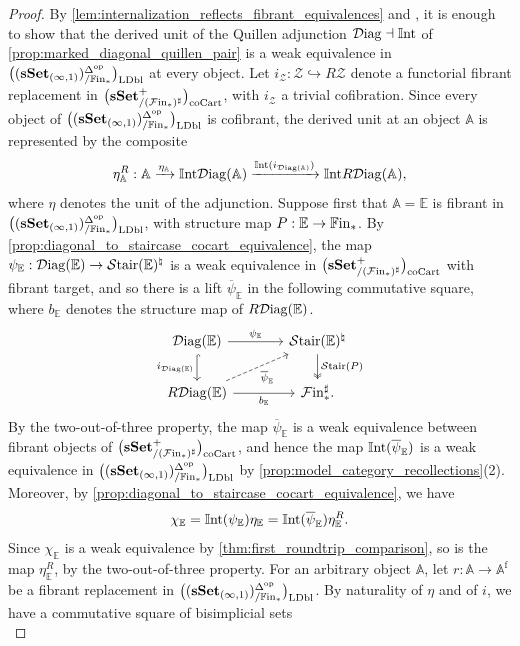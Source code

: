 \documentclass[10pt,reqno]{amsart}
\begin{document}
\begin{proof}
By \cref{lem:internalization_reflects_fibrant_equivalences} and
\cite[Corollary~1.3.16\textup{(c)}]{hovey1999model}, it is enough to
show that the derived unit of the Quillen adjunction
$\mathcal{D}\mathrm{iag}\dashv\mathbb{I}\mathrm{nt}$ of \cref{prop:marked_diagonal_quillen_pair} is a
weak equivalence in $\bigl((\mathbf{sSet}_{(\infty,1)})^{\Delta^{\mathrm{op}}}_{/\mathbb{F}\mathrm{in}_*}\bigr)_{\mathrm{LDbl}}$ at every object. Let
$i_{\mathcal Z}:\mathcal Z\hookrightarrow R\mathcal Z$ denote a
functorial fibrant replacement in $\bigl(\mathbf{sSet}^+_{/(\mathcal{F}\mathrm{in}_*)^\sharp}\bigr)_{\mathrm{coCart}}$, with $i_{\mathcal Z}$
a trivial cofibration. Since every object of $\bigl((\mathbf{sSet}_{(\infty,1)})^{\Delta^{\mathrm{op}}}_{/\mathbb{F}\mathrm{in}_*}\bigr)_{\mathrm{LDbl}}$ is cofibrant,
the derived unit at an object $\mathbb A$ is represented by the
composite
\[
 \eta^R_{\mathbb A}:
 \mathbb A\xrightarrow{\eta_{\mathbb A}}
 \mathbb{I}\mathrm{nt}\mathcal{D}\mathrm{iag}(\mathbb A)
 \xrightarrow{\mathbb{I}\mathrm{nt}(i_{\mathcal{D}\mathrm{iag}(\mathbb A)})}
 \mathbb{I}\mathrm{nt} R\mathcal{D}\mathrm{iag}(\mathbb A),
\]
where $\eta$ denotes the unit of the adjunction. Suppose first that
$\mathbb A=\mathbb E$ is fibrant in $\bigl((\mathbf{sSet}_{(\infty,1)})^{\Delta^{\mathrm{op}}}_{/\mathbb{F}\mathrm{in}_*}\bigr)_{\mathrm{LDbl}}$, with structure map
$P:\mathbb E\to\mathbb{F}\mathrm{in}_*$. By
\cref{prop:diagonal_to_staircase_cocart_equivalence}, the map
$\psi_{\mathbb E}:\mathcal{D}\mathrm{iag}(\mathbb E)\to\mathcal{S}\mathrm{tair}(\mathbb E)^\natural$ is
a weak equivalence in $\bigl(\mathbf{sSet}^+_{/(\mathcal{F}\mathrm{in}_*)^\sharp}\bigr)_{\mathrm{coCart}}$ with fibrant target, and so there is
a lift $\overline\psi_{\mathbb E}$ in the following commutative
square, where $b_{\mathbb E}$ denotes the structure map of
$R\mathcal{D}\mathrm{iag}(\mathbb E)$.
\[
\begin{tikzcd}[ampersand replacement=\&,column sep=large]
 \Diag(\mathbb E)
   \arrow[r,"\psi_{\mathbb E}"]
   \arrow[d,hook,"i_{\Diag(\mathbb E)}"']
 \&\Stair(\mathbb E)^\natural
   \arrow[d,two heads,"\Stair(P)"]
 \\
 R\Diag(\mathbb E)
   \arrow[r,"b_{\mathbb E}"']
   \arrow[ur,dashed,"\overline\psi_{\mathbb E}"']
 \&\simFin^\sharp.
\end{tikzcd}
\]
By the two-out-of-three property, the map
$\overline\psi_{\mathbb E}$ is a weak equivalence between fibrant
objects of $\bigl(\mathbf{sSet}^+_{/(\mathcal{F}\mathrm{in}_*)^\sharp}\bigr)_{\mathrm{coCart}}$, and hence the map
$\mathbb{I}\mathrm{nt}(\overline\psi_{\mathbb E})$ is a weak equivalence in
$\bigl((\mathbf{sSet}_{(\infty,1)})^{\Delta^{\mathrm{op}}}_{/\mathbb{F}\mathrm{in}_*}\bigr)_{\mathrm{LDbl}}$ by \cref{prop:model_category_recollections}(2). Moreover,
by \cref{prop:diagonal_to_staircase_cocart_equivalence}, we have
\[
 \chi_{\mathbb E}
 =\mathbb{I}\mathrm{nt}(\psi_{\mathbb E})\eta_{\mathbb E}
 =\mathbb{I}\mathrm{nt}(\overline\psi_{\mathbb E})\eta^R_{\mathbb E}.
\]
Since $\chi_{\mathbb E}$ is a weak equivalence by
\cref{thm:first_roundtrip_comparison}, so is the map
$\eta^R_{\mathbb E}$, by the two-out-of-three property. For an
arbitrary object $\mathbb A$, let
$r:\mathbb A\to\mathbb A^{\mathrm f}$ be a fibrant replacement in
$\bigl((\mathbf{sSet}_{(\infty,1)})^{\Delta^{\mathrm{op}}}_{/\mathbb{F}\mathrm{in}_*}\bigr)_{\mathrm{LDbl}}$. By naturality of $\eta$ and of $i$, we have a
commutative square of bisimplicial sets
\[
\]
\end{proof}
\end{document}
